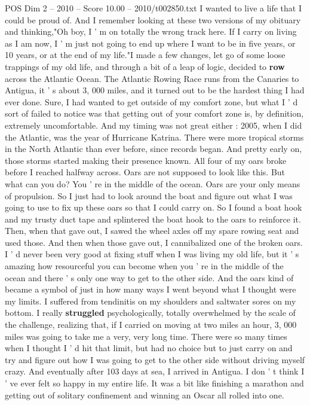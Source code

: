 \begin{textsample}{POS Dim 2 – 2010 – Score 10.00 – 2010/t002850.txt}
I wanted to live a life that I could be proud of.
And I remember looking at these two versions of my obituary and thinking,"Oh boy, I ' m on totally the wrong track here.
If I carry on living as I am now, I ' m just not going to end up where I want to be in five years, or 10 years, or at the end of my life."I made a few changes, let go of some loose trappings of my old life, and through a bit of a leap of logic, decided to \textbf{row} across the Atlantic Ocean.
The Atlantic Rowing Race runs from the Canaries to Antigua, it ' s about 3, 000 miles, and it turned out to be the hardest thing I had ever done.
Sure, I had wanted to get outside of my comfort zone, but what I ' d sort of failed to notice was that getting out of your comfort zone is, by definition, extremely uncomfortable.
And my timing was not great either : 2005, when I did the Atlantic, was the year of Hurricane Katrina.
There were more tropical storms in the North Atlantic than ever before, since records began.
And pretty early on, those storms started making their presence known.
All four of my oars broke before I reached halfway across.
Oars are not supposed to look like this.
But what can you do?
You ' re in the middle of the ocean.
Oars are your only means of propulsion.
So I just had to look around the boat and figure out what I was going to use to fix up these oars so that I could carry on.
So I found a boat hook and my trusty duct tape and splintered the boat hook to the oars to reinforce it.
Then, when that gave out, I sawed the wheel axles off my spare rowing seat and used those.
And then when those gave out, I cannibalized one of the broken oars.
I ' d never been very good at fixing stuff when I was living my old life, but it ' s amazing how resourceful you can become when you ' re in the middle of the ocean and there ' s only one way to get to the other side.
And the oars kind of became a symbol of just in how many ways I went beyond what I thought were my limits.
I suffered from tendinitis on my shoulders and saltwater sores on my bottom.
I really \textbf{struggled} psychologically, totally overwhelmed by the scale of the challenge, realizing that, if I carried on moving at two miles an hour, 3, 000 miles was going to take me a very, very long time.
There were so many times when I thought I ' d hit that limit, but had no choice but to just carry on and try and figure out how I was going to get to the other side without driving myself crazy.
And eventually after 103 days at sea, I arrived in Antigua.
I don ' t think I ' ve ever felt so happy in my entire life.
It was a bit like finishing a marathon and getting out of solitary confinement and winning an Oscar all rolled into one.

\end{textsample}
